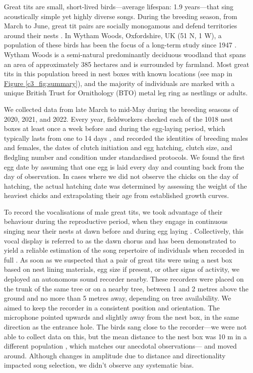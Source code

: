 Great tits are small, short-lived birds---average lifespan: 1.9 years---that sing acoustically simple yet highly diverse songs. During the breeding season, from March to June, great tit pairs are socially monogamous and defend territories around their nests \parencite{hinde1952}. In Wytham Woods, Oxfordshire, UK (51 N, 1 W), a population of these birds has been the focus of a long-term study since 1947 \parencite{lack1964}. Wytham Woods is a semi-natural predominantly deciduous woodland that spans an area of approximately 385 hectares and is surrounded by farmland. Most great tits in this population breed in nest boxes with known locations (see map in \hyperref[c3_fig:summary]{Figure \ref*{c3_fig:summary}}), and the majority of individuals are marked with a unique British Trust for Ornithology (BTO) metal leg ring as nestlings or adults. 

We collected data from late March to mid-May during the breeding seasons of 2020, 2021, and 2022. Every year, fieldworkers checked each of the 1018 nest boxes at least once a week before and during the egg-laying period, which typically lasts from one to 14 days \parencite{Perrins1965}, and recorded the identities of breeding males and females, the dates of clutch initiation and egg hatching, clutch size, and fledgling number and condition under standardised protocols. We found the first egg date by assuming that one egg is laid every day and counting back from the day of observation. In cases where we did not observe the chicks on the day of hatching, the actual hatching date was determined by assessing the weight of the heaviest chicks and extrapolating their age from established growth curves.

To record the vocalisations of male great tits, we took advantage of their behaviour during the reproductive period, when they engage in continuous singing near their nests at dawn before and during egg laying \parencite{mace1987}. Collectively, this vocal display is referred to as the dawn chorus and has been demonstrated to yield a reliable estimation of the song repertoire of individuals when recorded in full \parencite{rivera-gutierrez2012, vanduyse2005}. As soon as we suspected that a pair of great tits were using a nest box based on nest lining materials, egg size if present, or other signs of activity, we deployed an autonomous sound recorder nearby. These recorders were placed on the trunk of the same tree or on a nearby tree, between 1 and 2 metres above the ground and no more than 5 metres away, depending on tree availability. We aimed to keep the recorder in a consistent position and orientation. The microphone pointed upwards and slightly away from the nest box, in the same direction as the entrance hole. The birds sang close to the recorder---we were not able to collect data on this, but the mean distance to the nest box was 10 m in a different population \parencite{halfwerk2012}, which matches our anecdotal observations--- and moved around. Although changes in amplitude due to distance and directionality impacted song selection, we didn't observe any systematic bias.

